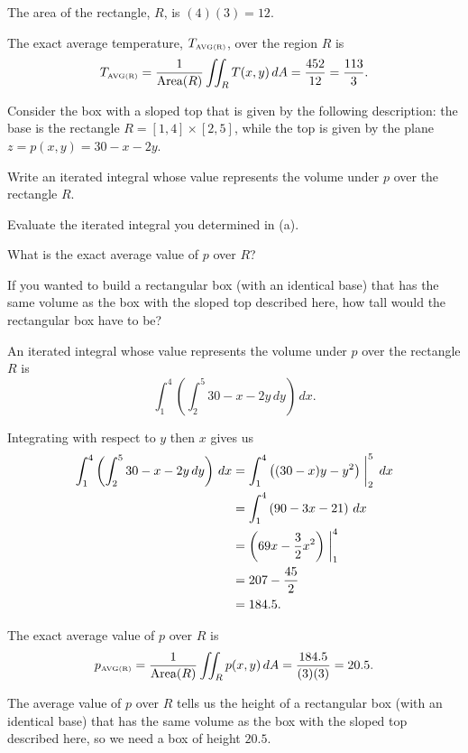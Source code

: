 \begin{exercises}
\begin{exerciseSolution}
	\item The area of the rectangle, $R$, is $(4)(3) = 12$. 
	
	\item The exact average temperature, $T_{\mbox{\tiny{AVG}(R)}}$, over the region $R$ is
\[T_{\mbox{\tiny{AVG}(R)}} = \frac{1}{\text{Area}(R)} \iint_R T(x,y) \, dA = \frac{452}{12} = \frac{113}{3}.\]

\ea
\end{exerciseSolution}

\item Consider the box with a sloped top that is given by the following description:  the base is the rectangle $R = [1,4] \times [2,5]$, while the top is given by the plane $z = p(x,y) = 30 - x - 2y$.

\ba
	\item Write an iterated integral whose value represents the volume under $p$ over the rectangle $R$. 
	\item Evaluate the iterated integral you determined in (a).
	\item What is the exact average value of $p$ over $R$?
	\item If you wanted to build a rectangular box (with an identical base) that has the same volume as the box with the sloped top described here, how tall would the rectangular box have to be?
\ea

\begin{exerciseSolution}
\ba
	\item An iterated integral whose value represents the volume under $p$ over the rectangle $R$ is
\[\int_1^4 \left( \int_2^5 30-x-2y \, dy \right) \, dx.\] 

	\item Integrating with respect to $y$ then $x$ gives us
\begin{align*}
\int_1^4 \left( \int_2^5 30-x-2y \, dy \right) \, dx &= \int_1^4 \left( (30-x)y - y^2 \right)\biggm|_2^5 \, dx \\
	&= \int_1^4 \left( 90-3x - 21 \right) \, dx \\
	&= \left( 69x-\frac{3}{2}x^2 \right)\biggm|_1^4  \\
	&= 207 - \frac{45}{2}  \\
	&= 184.5.
\end{align*}

	\item The exact average value of $p$ over $R$ is 
\[p_{\mbox{\tiny{AVG}(R)}} = \frac{1}{\text{Area}(R)} \iint_R p(x,y) \, dA = \frac{184.5}{(3)(3)} = 20.5.\]
	\item The average value of $p$ over $R$ tells us the height of a rectangular box (with an identical base) that has the same volume as the box with the sloped top described here, so we need a box of height $20.5$. 
\ea
\end{exerciseSolution}


\end{exercises} 

\afterexercises
